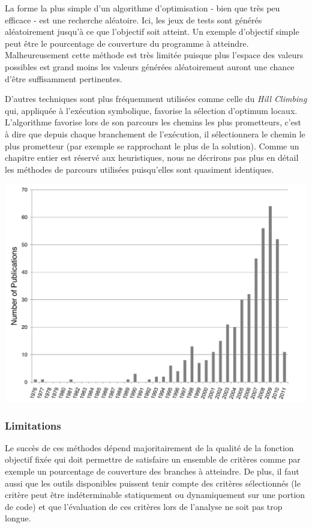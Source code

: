 La forme la plus simple d'un algorithme d'optimisation - bien que très peu efficace - est une recherche aléatoire. Ici, les jeux de tests sont générés aléatoirement jusqu'à ce que l'objectif soit atteint. Un exemple d'objectif simple peut être le pourcentage de couverture du programme à atteindre. Malheureusement cette méthode est très limitée puisque plus l'espace des valeurs possibles est grand moins les valeurs générées aléatoirement auront une chance d'être suffisamment pertinentes.

D'autres techniques sont plus fréquemment utilisées comme celle du \textit{Hill Climbing} qui, appliquée à l'exécution symbolique, favorise la sélection d'optimum locaux. L'algorithme favorise lors de son parcours les chemins les plus prometteurs, c'est à dire que depuis chaque branchement de l'exécution, il sélectionnera le chemin le plus prometteur (par exemple se rapprochant le plus de la solution). Comme un chapitre entier est réservé aux heuristiques, nous ne décrirons pas plus en détail les méthodes de parcours utilisées puisqu'elles sont quasiment identiques.

\begin{center}
    \includegraphics[scale=0.35]{../ressources/images/publications_search_based_testing.png}
    \label{popularity-search-based-testing}
\end{center}


\subsubsection*{Limitations}
Le succès de ces méthodes dépend majoritairement de la qualité de la fonction objectif fixée qui doit permettre de satisfaire un ensemble de critères comme par exemple un pourcentage de couverture des branches à atteindre. De plus, il faut aussi que les outils disponibles puissent tenir compte des critères sélectionnés (le critère peut être indéterminable statiquement ou dynamiquement sur une portion de code) et que l'évaluation de ces critères lors de l'analyse ne soit pas trop longue.

